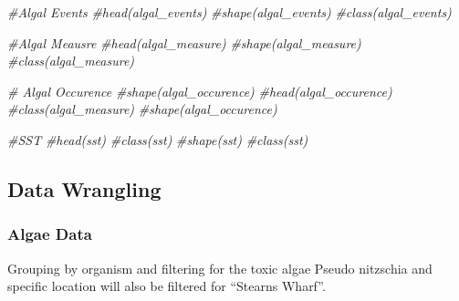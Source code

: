 \documentclass[
]{article}
\newenvironment{Shaded}{\begin{snugshade}}{\end{snugshade}}
\newcommand{\CommentTok}[1]{\textcolor[rgb]{0.56,0.35,0.01}{\textit{#1}}}
\begin{document}
\begin{Shaded}
\begin{Highlighting}[]
\CommentTok{\#Algal Events }
\CommentTok{\#head(algal\_events)}
\CommentTok{\#shape(algal\_events)}
\CommentTok{\#class(algal\_events)}

\CommentTok{\#Algal Meausre}
\CommentTok{\#head(algal\_measure)}
\CommentTok{\#shape(algal\_measure)}
\CommentTok{\#class(algal\_measure)}


\CommentTok{\# Algal Occurence}
\CommentTok{\#shape(algal\_occurence)}
\CommentTok{\#head(algal\_occurence)}
\CommentTok{\#class(algal\_measure)}
\CommentTok{\#shape(algal\_occurence)}

\CommentTok{\#SST}
\CommentTok{\#head(sst)}
\CommentTok{\#class(sst)}
\CommentTok{\#shape(sst)}
\CommentTok{\#class(sst)}
\end{Highlighting}
\end{Shaded}

\hypertarget{data-wrangling}{%
\subsection{Data Wrangling}\label{data-wrangling}}

\hypertarget{algae-data}{%
\subsubsection{Algae Data}\label{algae-data}}

Grouping by organism and filtering for the toxic algae Pseudo nitzschia
and specific location will also be filtered for ``Stearns Wharf''.
\end{document}
